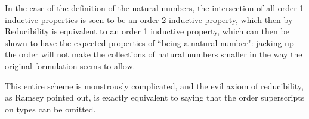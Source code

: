 \documentclass[12pt]{article}
\begin{document}
In the case of the definition of the natural numbers, the intersection of all order 1 inductive properties is seen to be an order 2 inductive property, which then by Reducibility is equivalent to an order 1 inductive property, which can then be shown to have the expected properties of ``being a natural number":  jacking up the order will not make the collections of natural numbers smaller in the way the original formulation seems to allow.

This entire scheme is monstrously complicated, and the evil axiom of reducibility, as Ramsey pointed out, is exactly equivalent to saying that the order superscripts on types can be omitted.
\end{document}
